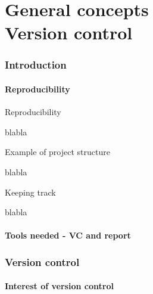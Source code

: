 \part{General concepts \protect\\
      Version control}
      
\frame{\partpage}

    
    
\section{Introduction}



    \subsection{Reproducibility}



\begin{frame}{Reproducibility}
    
    blabla
    
\end{frame}


\begin{frame}{Example of project structure}
    
    blabla
    
\end{frame}


\begin{frame}{Keeping track}
    
    blabla
    
\end{frame}




    \subsection{Tools needed - VC and report}





\section{Version control}



    \subsection{Interest of version control}
    
